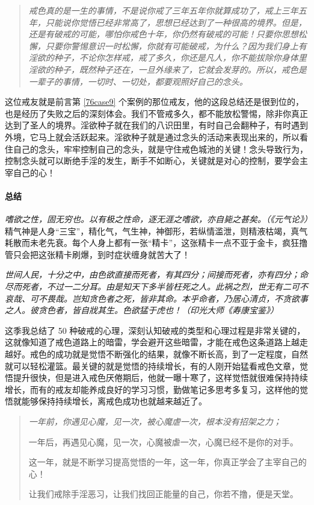 \begin{quote}\it
    戒色真的是一生的事情，不是说你戒了三年五年你就算成功了，戒上三年五年，只能说你觉悟已经非常高了，思想已经达到了一种很高的境界。但是，还是有破戒的可能，哪怕你戒色十年，你仍然有破戒的可能！只要你思想松懈，只要你警惕意识一时松懈，你就有可能破戒，为什么？因为我们身上有淫欲的种子，不论你怎样戒，戒了多久，你还是凡人，你不能拔除你身体里淫欲的种子，既然种子还在，一旦外缘来了，它就会发芽的。所以，戒色是一辈子的事情，一切时、一切处，都要观照好自己的念头。
\end{quote}

这位戒友就是前言第 \ref{76case9} 个案例的那位戒友，他的这段总结还是很到位的，也是经历了失败之后的深刻体会。我们不管戒多久，都不能放松警惕，除非你真正达到了圣人的境界。淫欲种子就在我们的八识田里，有时自己会翻种子，有时遇到外境，它马上就会活跃起来。淫欲种子就是通过念头的活动来表现出来的，所以看住自己的念头，牢牢控制自己的念头，就是守住戒色城池的关键！念头导致行为，控制念头就可以断绝手淫的发生，断手不如断心，关键就是对心的控制，要学会主宰自己的心！

\paragraph*{总结}

\textit{嗜欲之性，固无穷也。以有极之性命，逐无涯之嗜欲，亦自毙之甚矣。（《元气论》）}精气神是人身“三宝”，精化气，气生神，神御形，若纵情滥泄，则精液枯竭，真气耗散而未老先衰。每个人身上都有一张“精卡”，这张精卡一点不亚于金卡，疯狂撸管只会把这张精卡刷爆，到时症状缠身就苦大了！

\textit{世间人民，十分之中，由色欲直接而死者，有其四分；间接而死者，亦有四分；命尽而死者，不过一二分耳。由是知天下多半皆枉死之人。此祸之烈，世无有二可不哀哉、可不畏哉。岂知贪色者之死，皆非其命。本乎命者，乃居心清贞，不贪欲事之人。彼贪色者，皆自戕其生。色欲猛于虎也！（印光大师《寿康宝鉴》）}

这季我总结了 50 种破戒的心理，深刻认知破戒的类型和心理过程是非常关键的，这就像知道了戒色道路上的暗雷，学会避开这些暗雷，才能在戒色这条道路上越走越好。戒色的成功就是觉悟不断强化的结果，就像不断长高，到了一定程度，自然就可以轻松灌篮。最关键的就是觉悟的持续增长，有的人刚开始猛看戒色文章，觉悟提升很快，但是进入戒色厌倦期后，他就一曝十寒了，这样觉悟就很难保持持续增长，而有的戒友却能养成良好的学习习惯，勤做笔记多思考多复习，这样他的觉悟就能够保持持续增长，离戒色成功也就越来越近了。

\begin{quotation}\it
    一年前，你遇见心魔，见一次，被心魔虐一次，根本没有招架之力；

    一年后，再遇见心魔，见一次，心魔被虐一次，心魔已经不是你的对手。

    这一年，就是不断学习提高觉悟的一年，这一年，你真正学会了主宰自己的心！

    让我们戒除手淫恶习，让我们找回正能量的自己，你若不撸，便是天堂。
\end{quotation}
